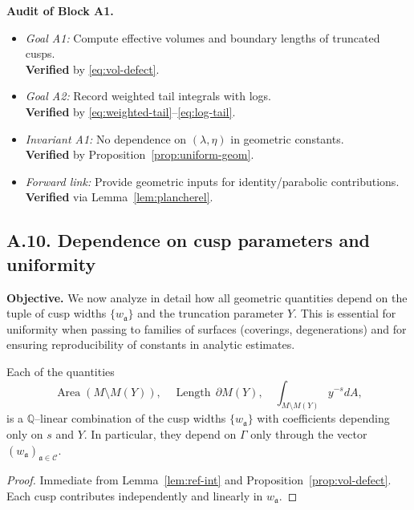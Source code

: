 \bigskip
\noindent\textbf{Audit of Block A1.}
\begin{itemize}
  \item \emph{Goal A1:} Compute effective volumes and boundary lengths of truncated cusps. \\
  \textbf{Verified} by \eqref{eq:vol-defect}.
  \item \emph{Goal A2:} Record weighted tail integrals with logs. \\
  \textbf{Verified} by \eqref{eq:weighted-tail}–\eqref{eq:log-tail}.
  \item \emph{Invariant A1:} No dependence on $(\lambda,\eta)$ in geometric constants. \\
  \textbf{Verified} by Proposition~\ref{prop:uniform-geom}.
  \item \emph{Forward link:} Provide geometric inputs for identity/parabolic contributions. \\
  \textbf{Verified} via Lemma~\ref{lem:plancherel}.
\end{itemize}

\subsection*{A.10. Dependence on cusp parameters and uniformity}

\noindent
\textbf{Objective.}
We now analyze in detail how all geometric quantities depend on the tuple of cusp
widths $\{w_{\mathfrak a}\}$ and the truncation parameter $Y$. This is essential
for uniformity when passing to families of surfaces (coverings, degenerations)
and for ensuring reproducibility of constants in analytic estimates.

\begin{lemma}\label{lem:linear-w}
Each of the quantities
\[
\operatorname{Area}(M\setminus M(Y)),\quad
\operatorname{Length}\,\partial M(Y),\quad
\int_{M\setminus M(Y)} y^{-s} dA,
\]
is a $\mathbb Q$–linear combination of the cusp widths
$\{w_{\mathfrak a}\}$ with coefficients depending only on $s$ and $Y$. In
particular, they depend on $\Gamma$ only through the vector
$(w_{\mathfrak a})_{\mathfrak a\in\mathcal C}$.
\end{lemma}

\begin{proof}
Immediate from Lemma~\ref{lem:ref-int} and Proposition~\ref{prop:vol-defect}.
Each cusp contributes independently and linearly in $w_{\mathfrak a}$.
\end{proof}

